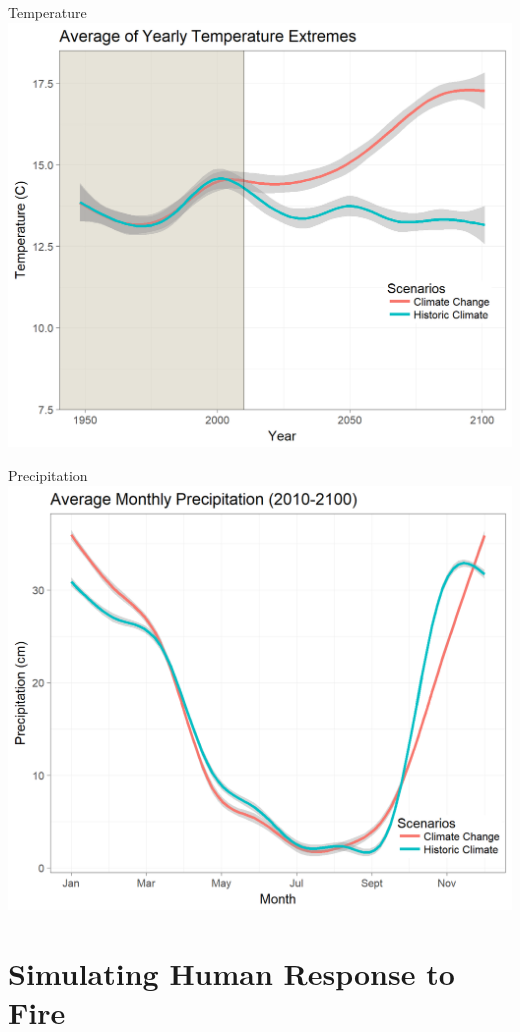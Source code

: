 \documentclass[xcolor=dvipsnames]{beamer}
\begin{document}
\begin{frame}{Temperature}
\centering\includegraphics[width=.75\linewidth]{temp_fix_legend.png}
\end{frame}

\begin{frame}{Precipitation}
\centering\includegraphics[width=.75\linewidth]{prec_legend_fix.png}
\end{frame}


\section{Simulating Human Response to Fire}
\subsection{}
\end{document}
